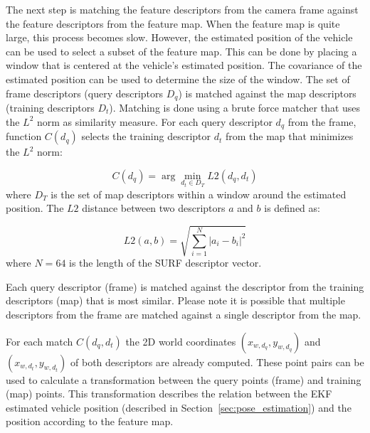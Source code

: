 
The next step is matching the feature descriptors from the camera frame against the feature descriptors from the feature map.
When the feature map is quite large, this process becomes slow.
However, the estimated position of the vehicle can be used to select a subset of the feature map.
This can be done by placing a window that is centered at the vehicle's estimated position.
The covariance of the estimated position can be used to determine the size of the window.
The set of frame descriptors (query descriptors $D_q$) is matched against the map descriptors (training descriptors $D_t$).
Matching is done using a brute force matcher that uses the $L^2$ norm as similarity measure.
For each query descriptor $d_q$ from the frame, function $C(d_q)$ selects the training descriptor $d_t$ from the map that minimizes the $L^2$ norm:


\begin{equation}
C(d_q) = \arg\min_{d_t \in D_T} L2(d_q, d_t)
\end{equation}
where $D_T$ is the set of map descriptors within a window around the estimated position.
The $L2$ distance between two descriptors $a$ and $b$ is defined as:

\begin{equation}
L2(a,b) =\sqrt { \sum_{i=1}^{N} \left| a_i - b_i \right| ^2 }
\end{equation}
where $N = 64$ is the length of the SURF descriptor vector.

Each query descriptor (frame) is matched against the descriptor from the training descriptors (map) that is most similar.
Please note it is possible that multiple descriptors from the frame are matched against a single descriptor from the map.

For each match $C(d_q, d_t)$ the 2D world coordinates $(x_{w, d_q}, y_{w, d_q})$ and $(x_{w, d_t}, y_{w, d_t})$ of both descriptors are already computed.
These point pairs can be used to calculate a transformation between the query points (frame) and training (map) points.
This transformation describes the relation between the EKF estimated vehicle position (described in Section~\ref{sec:pose_estimation}) and the position according to the feature map.

